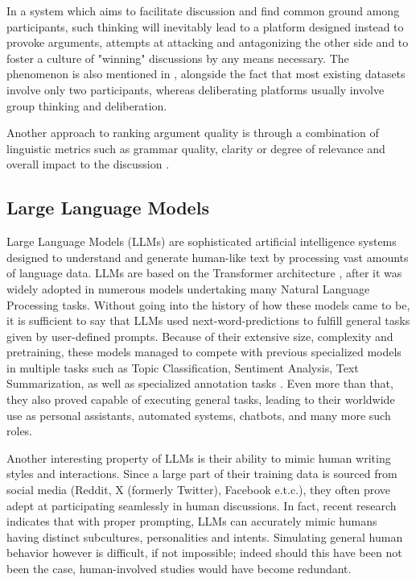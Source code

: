 In a system which aims to facilitate discussion and find common ground among participants, such thinking will inevitably lead to a platform designed instead to provoke arguments, attempts at attacking and antagonizing the other side and to foster a culture of "winning" discussions by any means necessary. The phenomenon is also mentioned in \cite{karadzhov2023delidata}, alongside the fact that most existing datasets involve only two participants, whereas deliberating platforms usually involve group thinking and deliberation. 

Another approach to ranking argument quality is through a combination of linguistic metrics such as grammar quality, clarity or degree of relevance and overall impact to the discussion \cite{Gretz2019ALD}.

\subsection{Large Language Models}
\label{sec:background:llm}

Large Language Models (LLMs) are sophisticated artificial intelligence systems designed to understand and generate human-like text by processing vast amounts of language data. LLMs are based on the Transformer architecture \cite{vaswani2023attentionneed}, after it was widely adopted in numerous models undertaking many Natural Language Processing tasks. Without going into the history of how these models came to be, it is sufficient to say that LLMs used next-word-predictions to fulfill general tasks given by user-defined prompts. Because of their extensive size, complexity and pretraining, these models managed to compete with  previous specialized models in multiple tasks such as Topic Classification, Sentiment Analysis, Text Summarization, \cite{ts2024} as well as specialized annotation tasks \cite{tan2024largelanguagemodelsdata}.  Even more than that, they also proved capable of executing general tasks, leading to their worldwide use as personal assistants, automated systems, chatbots, and many more such roles. 

Another interesting property of LLMs is their ability to mimic human writing styles and interactions. Since a large part of their training data is sourced from social media (Reddit, X (formerly Twitter),  Facebook e.t.c.), they often prove adept at participating seamlessly in human discussions. In fact, recent research \cite{Vezhnevets2023GenerativeAM, aher2023usinglargelanguagemodels} indicates that with proper prompting, LLMs can accurately mimic humans having distinct subcultures, personalities and intents. Simulating general human behavior however is difficult, if not impossible; indeed should this have been not been the case, human-involved studies would have become redundant.

